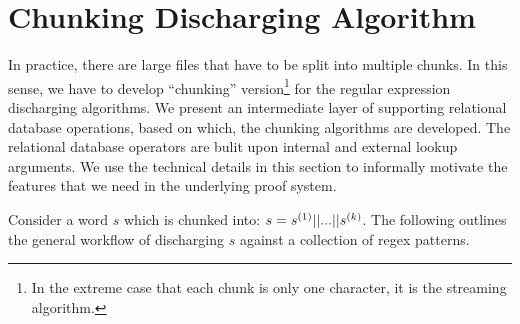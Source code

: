 \section{Chunking Discharging Algorithm}
In practice, there are large files that have to be split into multiple
chunks. In this sense, we have to develop ``chunking'' version\footnote{In
the extreme case that each chunk is only one character, it is the 
streaming algorithm.} for the regular expression discharging
algorithms.
We present an intermediate layer of 
supporting relational database operations, based on which,
the chunking algorithms are developed. The relational database
operators are bulit upon internal and external lookup arguments.
We use the technical details in this section to
informally motivate the features that we need in the underlying
proof system. 

Consider a word $s$ which is chunked into: 
$s = s^{(1)} || ... || s^{(k)}$. 
The following outlines the general workflow of discharging
$s$ against a collection of regex patterns.


